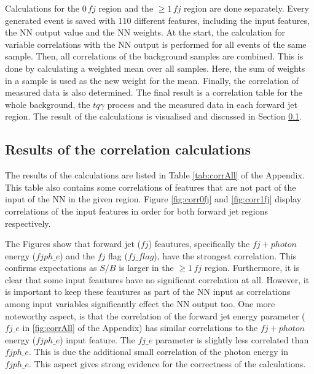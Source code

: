 Calculations for the $0\, fj$ region and the $\geq 1\, fj$ region are done separately.  
Every generated event is saved with 110 different features, including the input features, the NN output value and the NN weights. 
At the start, the calculation for variable correlations with the NN output is performed for all events of the same sample.  
Then, all correlations of the background samples are combined. This is done by calculating a weighted mean over all samples. Here, the sum of weights in a sample is used as the new weight for the mean.
Finally, the correlation of measured data is also determined. The final result is a correlation table for the whole background, the $tq\gamma$ process and the measured data in each forward jet region. 
The result of the calculations is visualised and discussed in Section \ref{sec:corrvis}.


\subsection{Results of the correlation calculations}
\label{sec:corrvis}
The results of the calculations are listed in Table \ref{tab:corrAll} of the Appendix. This table also contains some correlations of features that are not part of the input of the NN in the given region.  
Figure \ref{fig:corr0fj} and \autoref{fig:corr1fj} display correlations of the input features in order for both forward jet regions respectively. 

The Figures show that forward jet ($fj$) feautures, specifically the $fj+photon$ energy ($fjph\_e$) and the $fj$ flag ($fj\_flag$), have the strongest correlation. This confirms expectations as $S/B$ is larger in the $\geq 1\, fj$ region. 
Furthermore, it is clear that some input feautures have no significant correlation at all. However, it is important to keep these feautures as part of the NN input as correlations among input variables significantly effect the NN output too. 
One more noteworthy aspect, is that the correlation of the forward jet energy parameter ($fj\_e$ in \autoref{fig:corrAll} of the Appendix) has similar correlations to the $fj+photon$ energy ($fjph\_e$) input feature. 
The $fj\_e$ parameter is slightly less correlated than $fjph\_e$. This is due the additional small correlation of the photon energy in $fjph\_e$. This aspect gives strong evidence for the correctness of the calculations. 



